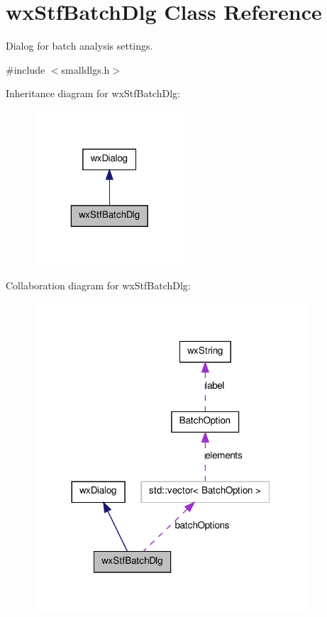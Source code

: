 \hypertarget{classwxStfBatchDlg}{
\section{wxStfBatchDlg Class Reference}
\label{classwxStfBatchDlg}
}


Dialog for batch analysis settings.  




{\ttfamily \#include $<$smalldlgs.h$>$}



Inheritance diagram for wxStfBatchDlg:
\nopagebreak
\begin{figure}[H]
\begin{center}
\leavevmode
\includegraphics[width=160pt]{classwxStfBatchDlg__inherit__graph}
\end{center}
\end{figure}


Collaboration diagram for wxStfBatchDlg:
\nopagebreak
\begin{figure}[H]
\begin{center}
\leavevmode
\includegraphics[width=288pt]{classwxStfBatchDlg__coll__graph}
\end{center}
\end{figure}
